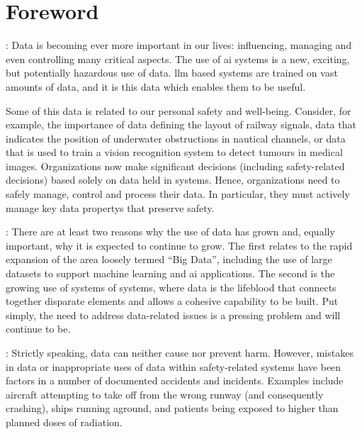 \makeatletter		%
\dsiwg@intblankpage
\makeatother

\pagestyle{FirstPageFrontMatter}
\section*{Foreword}


:
Data is becoming ever more important in our lives: influencing, managing and even controlling many critical aspects.
The use of \gls{ai} systems is a new, exciting, but potentially hazardous use of data. \Gls{llm}  based systems are trained on vast amounts of data, and it is this data which enables them to be useful.

Some of this data is related to our personal safety and well-being.
Consider, for example, the importance of data defining the layout of railway signals,
data that indicates the position of underwater obstructions in nautical channels, or data that
is used to train a vision recognition system to detect tumours in medical images.
Organizations now make significant decisions (including safety-related decisions) based solely on data held in systems.
Hence, organizations need to safely manage, control and process their data.
In particular, they must actively manage key \glspl{data property} that preserve safety.

: There are at least two reasons why the use of data has grown and, equally important, why it is expected to continue to grow. The  first relates to the rapid expansion of the area loosely termed ``Big Data'', including the use of large \glspl{dataset} to support machine learning and \gls{ai} applications. The second is the growing use of systems of systems, where data is the lifeblood that connects together disparate elements and allows a cohesive capability to be built. Put simply, the need to address data-related issues is a pressing problem and will continue to be.

: Strictly speaking,
data can neither cause nor prevent harm.
However, mistakes in data or inappropriate uses of data within safety-related systems have been factors in a number of documented accidents and incidents. Examples include aircraft attempting to take off from the wrong runway (and consequently crashing), ships running aground, and patients being exposed to higher than planned doses of radiation.

